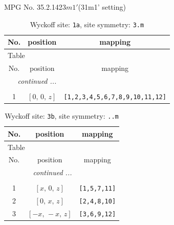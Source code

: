 \documentclass[fleqn,8pt]{jsarticle}
\begin{document}
\setcounter{MaxMatrixCols}{32}

\renewcommand{\tablename}{Table~}
\renewcommand{\figurename}{Figure~}
\begin{center}
\LARGE
MPG No. 35.2.142\quad$3m1'$\quad(31m1' setting)
\end{center}
\renewcommand{\arraystretch}{1.2}
\begin{longtable}{ccc}
\caption{Wyckoff site: {\tt 1a}, site symmetry: {\tt 3.m}}
 \\
 \hline \hline
No. & position & mapping \\ \hline \endfirsthead

\multicolumn{2}{l}{\tablename\ \thetable{}} \\
 \hline \hline
No. & position & mapping \\ \hline \endhead

 \hline \hline
\multicolumn{2}{r}{\footnotesize\it continued ...} \\ \endfoot

 \hline \hline
\multicolumn{2}{r}{} \\ \endlastfoot

1 & $\left[ 0,\, 0,\, z \right]$ & {\tt [1,2,3,4,5,6,7,8,9,10,11,12]} \\
\end{longtable}
\renewcommand{\arraystretch}{1.2}
\begin{longtable}{ccc}
\caption{Wyckoff site: {\tt 3b}, site symmetry: {\tt ..m}}
 \\
 \hline \hline
No. & position & mapping \\ \hline \endfirsthead

\multicolumn{2}{l}{\tablename\ \thetable{}} \\
 \hline \hline
No. & position & mapping \\ \hline \endhead

 \hline \hline
\multicolumn{2}{r}{\footnotesize\it continued ...} \\ \endfoot

 \hline \hline
\multicolumn{2}{r}{} \\ \endlastfoot

1 & $\left[ x,\, 0,\, z \right]$ & {\tt [1,5,7,11]} \\ \hline
2 & $\left[ 0,\, x,\, z \right]$ & {\tt [2,4,8,10]} \\ \hline
3 & $\left[ - x,\, - x,\, z \right]$ & {\tt [3,6,9,12]} \\
\end{longtable}
\renewcommand{\arraystretch}{1.2}
\end{document}
